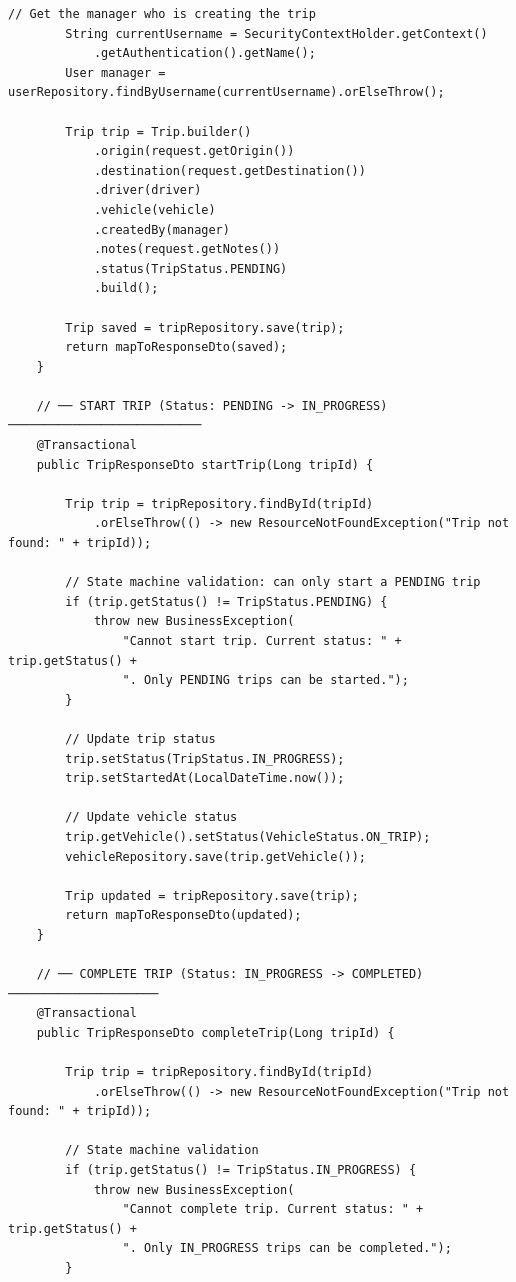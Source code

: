 \documentclass[12pt,a4paper]{report}
\begin{document}
\begin{lstlisting}[caption=TripService.java -- Full Business Logic]
        // Get the manager who is creating the trip
        String currentUsername = SecurityContextHolder.getContext()
            .getAuthentication().getName();
        User manager = userRepository.findByUsername(currentUsername).orElseThrow();

        Trip trip = Trip.builder()
            .origin(request.getOrigin())
            .destination(request.getDestination())
            .driver(driver)
            .vehicle(vehicle)
            .createdBy(manager)
            .notes(request.getNotes())
            .status(TripStatus.PENDING)
            .build();

        Trip saved = tripRepository.save(trip);
        return mapToResponseDto(saved);
    }

    // ── START TRIP (Status: PENDING -> IN_PROGRESS) ───────────────────────────
    @Transactional
    public TripResponseDto startTrip(Long tripId) {

        Trip trip = tripRepository.findById(tripId)
            .orElseThrow(() -> new ResourceNotFoundException("Trip not found: " + tripId));

        // State machine validation: can only start a PENDING trip
        if (trip.getStatus() != TripStatus.PENDING) {
            throw new BusinessException(
                "Cannot start trip. Current status: " + trip.getStatus() +
                ". Only PENDING trips can be started.");
        }

        // Update trip status
        trip.setStatus(TripStatus.IN_PROGRESS);
        trip.setStartedAt(LocalDateTime.now());

        // Update vehicle status
        trip.getVehicle().setStatus(VehicleStatus.ON_TRIP);
        vehicleRepository.save(trip.getVehicle());

        Trip updated = tripRepository.save(trip);
        return mapToResponseDto(updated);
    }

    // ── COMPLETE TRIP (Status: IN_PROGRESS -> COMPLETED) ─────────────────────
    @Transactional
    public TripResponseDto completeTrip(Long tripId) {

        Trip trip = tripRepository.findById(tripId)
            .orElseThrow(() -> new ResourceNotFoundException("Trip not found: " + tripId));

        // State machine validation
        if (trip.getStatus() != TripStatus.IN_PROGRESS) {
            throw new BusinessException(
                "Cannot complete trip. Current status: " + trip.getStatus() +
                ". Only IN_PROGRESS trips can be completed.");
        }


\end{lstlisting}
\end{document}
